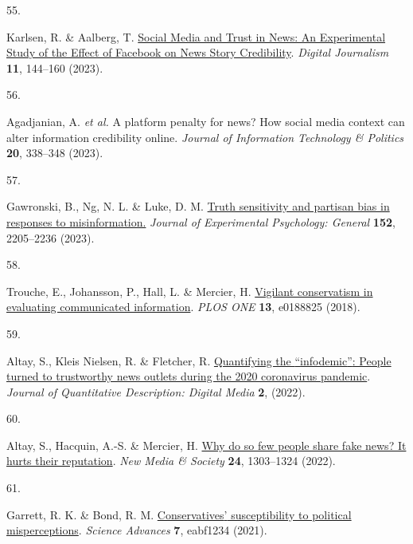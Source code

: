 \documentclass[
  man]{apa6}
\newlength{\cslhangindent}
\newlength{\csllabelwidth}
\newenvironment{CSLReferences}[2] %
 {\begin{list}{}{%
  \setlength{\itemindent}{0pt}
  \setlength{\leftmargin}{0pt}
  \setlength{\parsep}{0pt}
  \ifodd #1
   \setlength{\leftmargin}{\cslhangindent}
   \setlength{\itemindent}{-1\cslhangindent}
  \fi
  \setlength{\itemsep}{#2\baselineskip}}}
 {\end{list}}
\newcommand{\CSLLeftMargin}[1]{\parbox[t]{\csllabelwidth}{\strut#1\strut}}
\newcommand{\CSLRightInline}[1]{\parbox[t]{\linewidth - \csllabelwidth}{\strut#1\strut}}
\begin{document}
\begin{CSLReferences}{0}{0}
\CSLLeftMargin{55. }%
\CSLRightInline{Karlsen, R. \& Aalberg, T. \href{https://doi.org/10.1080/21670811.2021.1945938}{Social Media and Trust in News: An Experimental Study of the Effect of Facebook on News Story Credibility}. \emph{Digital Journalism} \textbf{11}, 144--160 (2023).}

\CSLLeftMargin{56. }%
\CSLRightInline{Agadjanian, A. \emph{et al.} A platform penalty for news? How social media context can alter information credibility online. \emph{Journal of Information Technology \& Politics} \textbf{20}, 338--348 (2023).}

\CSLLeftMargin{57. }%
\CSLRightInline{*Gawronski, B., Ng, N. L. \& Luke, D. M. \href{https://doi.org/10.1037/xge0001381}{Truth sensitivity and partisan bias in responses to misinformation.} \emph{Journal of Experimental Psychology: General} \textbf{152}, 2205--2236 (2023).}

\CSLLeftMargin{58. }%
\CSLRightInline{Trouche, E., Johansson, P., Hall, L. \& Mercier, H. \href{https://doi.org/10.1371/journal.pone.0188825}{Vigilant conservatism in evaluating communicated information}. \emph{PLOS ONE} \textbf{13}, e0188825 (2018).}

\CSLLeftMargin{59. }%
\CSLRightInline{Altay, S., Kleis Nielsen, R. \& Fletcher, R. \href{https://doi.org/10.51685/jqd.2022.020}{Quantifying the {``}infodemic{''}: People turned to trustworthy news outlets during the 2020 coronavirus pandemic}. \emph{Journal of Quantitative Description: Digital Media} \textbf{2}, (2022).}

\CSLLeftMargin{60. }%
\CSLRightInline{Altay, S., Hacquin, A.-S. \& Mercier, H. \href{https://doi.org/10.1177/1461444820969893}{Why do so few people share fake news? It hurts their reputation}. \emph{New Media \& Society} \textbf{24}, 1303--1324 (2022).}

\CSLLeftMargin{61. }%
\CSLRightInline{*Garrett, R. K. \& Bond, R. M. \href{https://doi.org/10.1126/sciadv.abf1234}{Conservatives{'} susceptibility to political misperceptions}. \emph{Science Advances} \textbf{7}, eabf1234 (2021).}


\end{CSLReferences}
\end{document}

